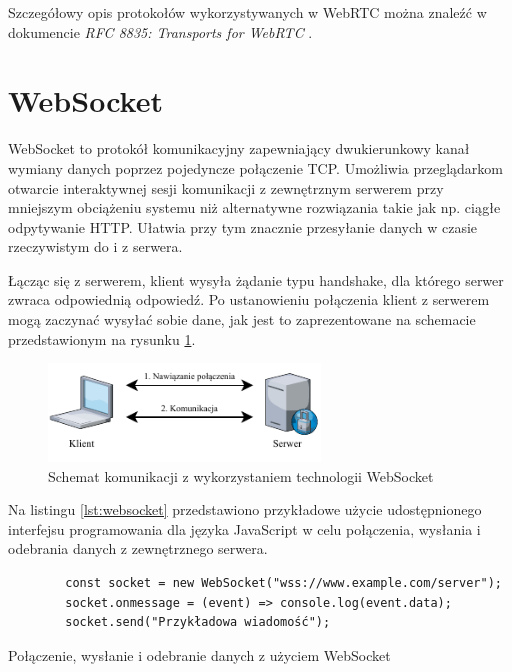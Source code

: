 \documentclass[language=polish,type=master]{aghmodern}
\begin{document}
Szczegółowy opis protokołów wykorzystywanych w WebRTC można znaleźć w dokumencie \emph{RFC 8835: Transports for WebRTC} \cite{RFC8835}.

\pagebreak

\section{WebSocket}
WebSocket to protokół komunikacyjny zapewniający dwukierunkowy kanał wymiany danych poprzez pojedyncze połączenie TCP.
Umożliwia przeglądarkom otwarcie interaktywnej sesji komunikacji z zewnętrznym serwerem przy mniejszym obciążeniu systemu niż alternatywne rozwiązania takie jak np. ciągłe odpytywanie HTTP.
Ułatwia przy tym znacznie przesyłanie danych w czasie rzeczywistym do i z serwera.

Łącząc się z serwerem, klient wysyła żądanie typu handshake\footnotemark{}, dla którego serwer zwraca odpowiednią odpowiedź.
Po ustanowieniu połączenia klient z serwerem mogą zaczynać wysyłać sobie dane, jak jest to zaprezentowane na schemacie przedstawionym na rysunku \ref{fig:websocket}.

\begin{figure}[H]
    \centering
    \vspace*{15pt}
    \includegraphics[width=0.6435\textwidth]{images/websocket.pdf}
    \caption{Schemat komunikacji z wykorzystaniem technologii WebSocket}
    \label{fig:websocket}
\end{figure}

Na listingu \ref{lst:websocket} przedstawiono przykładowe użycie udostępnionego interfejsu programowania dla języka JavaScript w celu połączenia, wysłania i odebrania danych z zewnętrznego serwera.

\begin{listing}[H]
    \begin{verbatim}
        const socket = new WebSocket("wss://www.example.com/server");
        socket.onmessage = (event) => console.log(event.data);
        socket.send("Przykładowa wiadomość");
    \end{verbatim}
    \caption{Połączenie, wysłanie i odebranie danych z użyciem WebSocket}
    \label{lst:websocket}
\end{listing}
\end{document}
